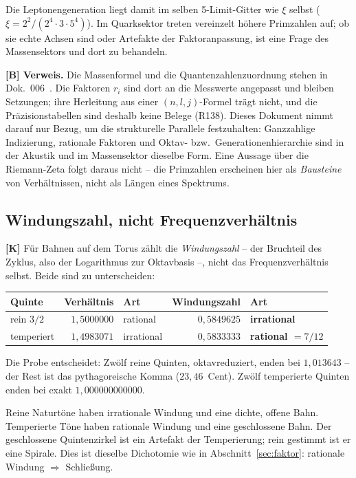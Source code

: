 Die Leptonengeneration liegt damit im selben 5-Limit-Gitter wie $\xi$
selbst ($\xi = 2^2/(2^4\cdot3\cdot5^4)$). Im Quarksektor treten
vereinzelt h\"ohere Primzahlen auf; ob sie echte Achsen sind oder
Artefakte der Faktoranpassung, ist eine Frage des Massensektors und
dort zu behandeln.

\textbf{[B] Verweis.} Die Massenformel und die Quantenzahlenzuordnung
stehen in Dok.~006~\cite{pascher_ffgft}. Die Faktoren $r_i$ sind dort
an die Messwerte angepasst und bleiben Setzungen; ihre Herleitung aus
einer $(n,l,j)$-Formel tr\"agt nicht, und die Pr\"azisionstabellen sind
deshalb keine Belege (R138). Dieses Dokument nimmt darauf nur Bezug,
um die strukturelle Parallele festzuhalten: Ganzzahlige Indizierung,
rationale Faktoren und Oktav- bzw.\ Generationenhierarchie sind in der
Akustik und im Massensektor dieselbe Form. Eine Aussage \"uber die
Riemann-Zeta folgt daraus nicht -- die Primzahlen erscheinen hier als
\emph{Bausteine} von Verh\"altnissen, nicht als L\"angen eines
Spektrums.

\subsection{Windungszahl, nicht Frequenzverh\"altnis}

\textbf{[K]} F\"ur Bahnen auf dem Torus z\"ahlt die
\emph{Windungszahl} -- der Bruchteil des Zyklus, also der Logarithmus
zur Oktavbasis --, nicht das Frequenzverh\"altnis selbst. Beide sind
zu unterscheiden:

\begin{center}
\begin{tabular}{lrlrl}
\toprule
Quinte & Verh\"altnis & Art & Windungszahl & Art \\
\midrule
rein $3/2$ & $1{,}5000000$ & rational & $0{,}5849625$ & \textbf{irrational} \\
temperiert & $1{,}4983071$ & irrational & $0{,}5833333$ & \textbf{rational $= 7/12$} \\
\bottomrule
\end{tabular}
\end{center}

Die Probe entscheidet: Zw\"olf reine Quinten, oktavreduziert, enden bei
$1{,}013643$ -- der Rest ist das pythagoreische Komma
($23{,}46$~Cent). Zw\"olf temperierte Quinten enden bei exakt
$1{,}000000000000$.

\begin{keyresult}
Reine Naturt\"one haben irrationale Windung und eine dichte, offene
Bahn. Temperierte T\"one haben rationale Windung und eine geschlossene
Bahn. Der geschlossene Quintenzirkel ist ein Artefakt der
Temperierung; rein gestimmt ist er eine Spirale. Dies ist dieselbe
Dichotomie wie in Abschnitt~\ref{sec:faktor}: rationale Windung
$\Rightarrow$ Schlie\ss ung.
\end{keyresult}

